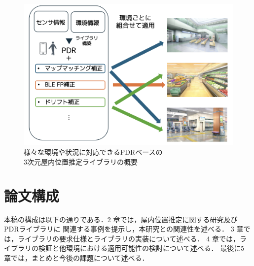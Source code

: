 \begin{figure}[h]
	\centering
	\includegraphics[width=\linewidth]{../image/first.png}
	\caption{様々な環境や状況に対応できるPDRベースの\\3次元屋内位置推定ライブラリの概要}    \label{fig:overview}
\end{figure}

\section{論文構成}
本稿の構成は以下の通りである．2 章では，屋内位置推定に関する研究及びPDRライブラリに
関連する事例を提示し，本研究との関連性を述べる．
3 章では，ライブラリの要求仕様とライブラリの実装について述べる．
4 章では，ライブラリの検証と他環境における適用可能性の検討について述べる．
最後に5 章では，まとめと今後の課題について述べる．


